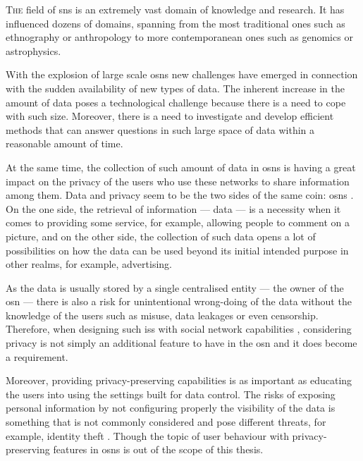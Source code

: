 \documentclass[showtrims,oldfontcommands]{kthesis}
\begin{document}

\lettrine{\textcolor[gray]{.25}{T}}{he} field of \acp{sn} is an extremely vast domain 
of knowledge and research. It has influenced dozens of domains, spanning from the 
most traditional ones such as ethnography or anthropology to more contemporanean 
ones such as genomics or astrophysics.


With the explosion of large scale \acp{osn} new challenges have emerged in connection 
with the sudden availability of new types of data. The inherent increase in the 
amount of data poses a technological challenge because there is a need to cope with 
such size. Moreover, there is a need to investigate and develop efficient methods 
that can answer questions in such large space of data within a reasonable amount 
of time.

At the same time, the collection of such amount of data in \acp{osn} is having a 
great impact on the privacy of the users who use these networks to share information 
among them. Data and privacy seem to be the two sides of the same coin: \acp{osn} 
\cite{BelkinC92}. On the one side, the retrieval of information --- data --- is 
a necessity when it comes to providing some service, for example, allowing people 
to comment on a picture, and on the other side, the collection of such data opens 
a lot of possibilities on how the data can be used beyond its initial intended purpose 
in other realms, for example, advertising.

As the data is usually stored by a single centralised entity --- the owner of the 
\ac{osn} --- there is also a risk for unintentional wrong-doing of the data without 
the knowledge of the users such as misuse, data leakages or even censorship. Therefore, 
when designing such \acp{is} with social network capabilities \cite{Abrams06, Lunt06, Lunt07, Zhu08, Lunt09}, 
considering privacy is not simply an additional feature to have in the \ac{osn} 
and it does become a requirement. 

Moreover, providing privacy-preserving capabilities is as important as educating 
the users into using the settings built for data control. The risks of exposing 
personal information by not configuring properly the visibility of the data is something 
that is not commonly considered and pose different threats, for example, identity 
theft \cite{GrossAH05, BrandtzaegLS10}. Though the topic of user behaviour with 
privacy-preserving features in \acp{osn} is out of the scope of this thesis.
\end{document}
